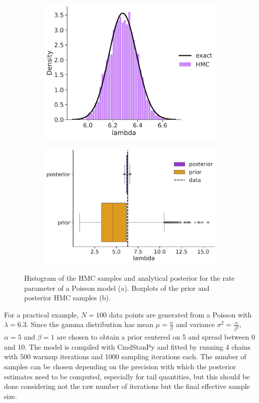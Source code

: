 \begin{figure}[t]
    \begin{subfigure}[b]{0.45\linewidth}
\includegraphics[width=\linewidth]{figures/ch2/poisson/plot_3.pdf}
\caption{}
\end{subfigure}
\begin{subfigure}[b]{0.5\linewidth}
    \includegraphics[width=\linewidth]{figures/ch2/poisson/cat_plot_0.pdf}
\caption{}
\end{subfigure}
\caption{Histogram of the HMC samples and analytical posterior for the rate parameter of a Poisson model (a). Boxplots of the prior and posterior HMC samples (b). } 
\label{fig:poispost}
\end{figure}

For a practical example, $N=100$ data points are generated from a Poisson with $\lambda=6.3$. Since the gamma distribution has mean $\mu=\frac{\alpha}{\beta}$ and variance $\sigma^2=\frac{\alpha}{\beta^2}$, $\alpha=5$ and $\beta=1$ are chosen to obtain a prior centered on 5 and spread between 0 and 10.
The model is compiled with CmdStanPy and fitted by running 4 chains with 500 warmup iterations and 1000 sampling
iterations each. The number of samples can be chosen depending on the precision with which the posterior estimates need
to be computed, especially for tail quantities, but this should be done considering not the raw number of iterations but the final effective sample size.

